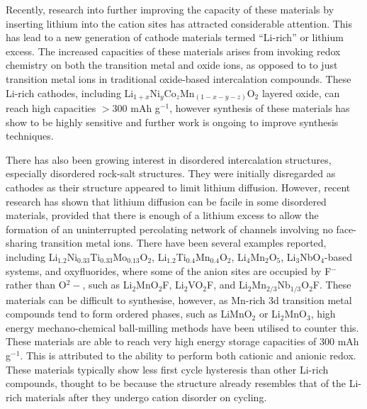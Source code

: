 \documentclass[../main.tex]{subfiles}
\begin{document}
Recently, research into further improving the capacity of these materials by inserting lithium into the cation sites has attracted considerable attention. This has lead to a new generation of cathode materials termed ``Li-rich'' or lithium excess. The increased capacities of these materials arises from invoking redox chemistry on both the transition metal and oxide ions, as opposed to to just transition metal ions in traditional oxide-based intercalation compounds. \cite{Sathiya2013,lee2014unlocking,Oishi2015,Seo2016,Gent2017,Assat2018,naylor2019depth,House2020,House2020a} These Li-rich cathodes, including Li$_{1+x}$Ni$_y$Co$_z$Mn$_{(1-x-y-z)}$O$_2$ layered oxide, can reach high capacities $>300$ mAh g$^{-1}$, however synthesis of these materials has show to be highly sensitive and further work is ongoing to improve synthesis techniques.\cite{Hy2016} 

There has also been growing interest in disordered intercalation structures, especially disordered rock-salt structures. They were initially disregarded as cathodes as their structure appeared to limit lithium diffusion. However, recent research has shown that lithium diffusion can be facile in some disordered materials, provided that there is enough of a lithium excess to allow the formation of an uninterrupted percolating network of channels involving no face-sharing transition metal ions.\cite{lee2014unlocking,Urban2014,Lee2015} There have been several examples reported, including Li$_{1.2}$Ni$_{0.33}$Ti$_{0.33}$Mo$_{0.13}$O$_2$,\cite{Lee2015} Li$_{1.2}$Ti$_{0.4}$Mn$_{0.4}$O$_2$,\cite{Yabuuchi2016a} Li$_4$Mn$_2$O$_5$,\cite{Freire2016,Yao2018,Bhandari2019454} Li$_3$NbO$_4$-based systems,\cite{Nakajima2017,Yabuuchi2015,Wang2015} and oxyfluorides, where some of the anion sites are occupied by F$^-$ rather than O$^2-$, such as Li$_2$MnO$_2$F,\cite{Sharpe2020,House2018,Lun2019} Li$_2$VO$_2$F,\cite{Chen2015,Chen2015a,Baur2019, Cambaz2019, Baur2020, Kallquist2019, Chang2020} and Li$_2$Mn$_{2/3}$Nb$_{1/3}$O$_2$F.\cite{Lee2018} These materials can be difficult to synthesise, however, as Mn-rich 3d transition metal compounds tend to form ordered phases, such as LiMnO$_2$ or Li$_2$MnO$_3$, high energy mechano-chemical ball-milling methods have been utilised to counter this.\cite{Freire2016,House2018,Freire2017} These materials are able to reach very high energy storage capacities of $300$ mAh g$^{-1}$. \cite{Jacquet2019} This is attributed to the ability to perform both cationic and anionic redox. \cite{Jacquet2019,clement2020,Chang2020} These materials typically show less first cycle hysteresis than other Li-rich compounds, thought to be because the structure already resembles that of the Li-rich materials after they undergo cation disorder on cycling.
\end{document}

